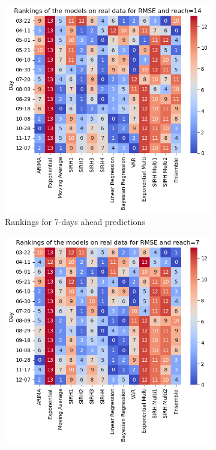 \begin{figure}[h!]
    \centering
    \begin{subfigure}[b]{0.45\textwidth}
      \centering
      \includegraphics[width=\textwidth]{figures/heatmap_real_14.png}  %
      \caption{Rankings for 7-days ahead predictions}
      \label{fig:sousfig1}
    \end{subfigure}
    \hfill
    \begin{subfigure}[b]{0.45\textwidth}
      \centering
      \includegraphics[width=\textwidth]{figures/heatmap_real_7.png}  %

\end{subfigure}
\end{figure}
